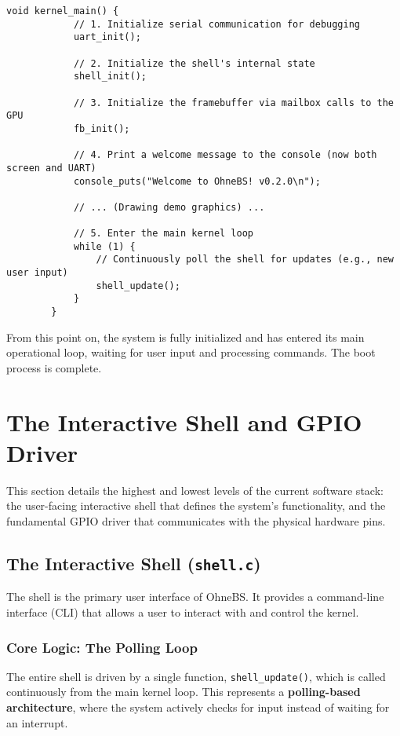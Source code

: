 \documentclass[a4paper, 11pt]{article}
\begin{document}
	\begin{lstlisting}[style=cstyle, caption={The entry point of the C kernel.}]
		void kernel_main() {
			// 1. Initialize serial communication for debugging
			uart_init();
			
			// 2. Initialize the shell's internal state
			shell_init();
			
			// 3. Initialize the framebuffer via mailbox calls to the GPU
			fb_init();
			
			// 4. Print a welcome message to the console (now both screen and UART)
			console_puts("Welcome to OhneBS! v0.2.0\n");
			
			// ... (Drawing demo graphics) ...
			
			// 5. Enter the main kernel loop
			while (1) {
				// Continuously poll the shell for updates (e.g., new user input)
				shell_update();
			}
		}
	\end{lstlisting}
	From this point on, the system is fully initialized and has entered its main operational loop, waiting for user input and processing commands. The boot process is complete.
	
	
	\section{The Interactive Shell and GPIO Driver}
	
	This section details the highest and lowest levels of the current software stack: the user-facing interactive shell that defines the system's functionality, and the fundamental GPIO driver that communicates with the physical hardware pins.
	
	\subsection{The Interactive Shell (\texttt{shell.c})}
	The shell is the primary user interface of OhneBS. It provides a command-line interface (CLI) that allows a user to interact with and control the kernel.
	
	\subsubsection{Core Logic: The Polling Loop}
	The entire shell is driven by a single function, \texttt{shell\_update()}, which is called continuously from the main kernel loop. This represents a \textbf{polling-based architecture}, where the system actively checks for input instead of waiting for an interrupt.
	
\end{document}
